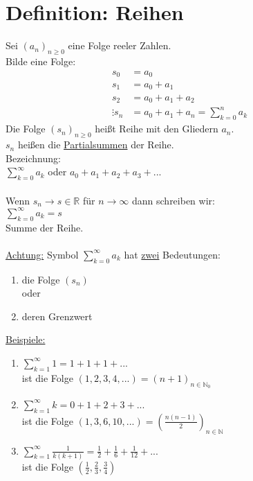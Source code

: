 \section{Definition: Reihen}
Sei $(a_n)_{n \geq 0}$ eine Folge reeler Zahlen.\\
Bilde eine Folge:
\begin{align*}
s_0 &= a_0\\
s_1 &= a_0 + a_1\\
s_2 &= a_0 + a_1 + a_2\\
\vdots
s_n &= a_0 + a_1 + a_n = \sum\limits_{k = 0}^{n} a_k
\end{align*}
Die Folge $(s_n)_{n \geq 0}$ heißt Reihe mit den Gliedern $a_n$.\\
$s_n$ heißen die \underline{Partialsummen} der Reihe.\\
Bezeichnung:\\
$\sum\limits_{k = 0}^{\infty} a_k$ oder $a_0 + a_1 + a_2 + a_3 + ...$\\ \\
Wenn $s_n \to s \in \mathbb{R}$ für $n \to \infty$ dann schreiben wir:\\
$\sum\limits_{k = 0}^{\infty} a_k = s$\\
Summe der Reihe.\\
\\
\underline{Achtung:} Symbol $\sum\limits_{k = 0}^{\infty} a_k$ hat \underline{zwei} Bedeutungen:
\begin{enumerate}
\item{die Folge $(s_n)$} \\
oder 
\item{deren Grenzwert}
\end{enumerate}
\noindent \underline{Beispiele:}\\
\begin{enumerate}
\item{$\sum\limits_{k = 1}^{\infty} 1 = 1+1+1+...$\\
ist die Folge $(1, 2, 3, 4,...) = (n + 1)_{n \in \mathbb{N}_{0}}$}
\item{$\sum\limits_{k = 1}^{\infty} k = 0 + 1 + 2 + 3+ ...$ \\
ist die Folge $(1, 3, 6, 10,...) = (\displaystyle\frac{n(n - 1)}{2})_{n \in \mathbb{N}}$ }
\item{$\sum\limits_{k = 1}^{\infty} \displaystyle\frac{1}{k(k+1)} = \displaystyle\frac{1}{2} + \displaystyle\frac{1}{6} + \displaystyle\frac{1}{12} + ...$\\
ist die Folge $(\displaystyle\frac{1}{2}, \displaystyle\frac{2}{3}, \displaystyle\frac{3}{4})$}
\end{enumerate}
